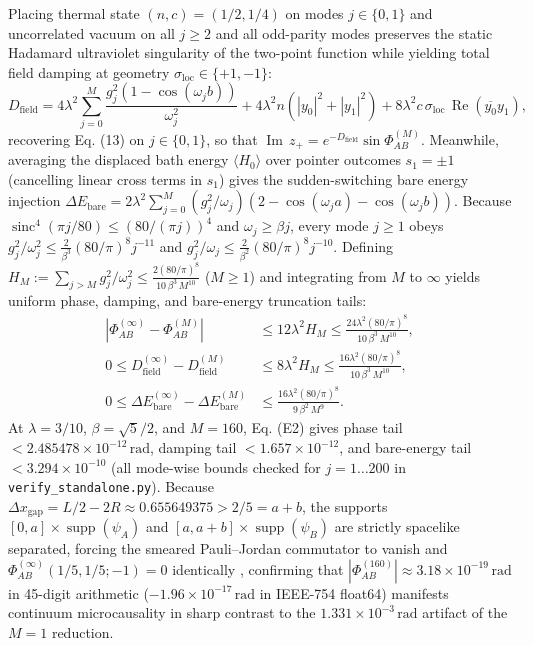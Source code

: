 \documentclass[11pt,letterpaper]{article}
\theoremstyle{definition}
\begin{document}
Placing thermal state \((n, c) = (1/2, 1/4)\) on modes
\(j \in \{0, 1\}\) and uncorrelated vacuum on all \(j \ge 2\) and all
odd-parity modes preserves the static Hadamard ultraviolet singularity
of the two-point function while yielding total field damping at geometry
\(\sigma_{\mathrm{loc}} \in \{+1, -1\}\):
\[D_{\mathrm{field}} = 4\lambda^2 \sum_{j=0}^{M} \frac{g_j^2(1 - \cos(\omega_j b))}{\omega_j^2} + 4\lambda^2 n\left(|y_0|^2 + |y_1|^2\right) + 8\lambda^2 c\,\sigma_{\mathrm{loc}}\,\operatorname{Re}\!\left(\overline{y_0}y_1\right),\]
recovering Eq. (13) on \(j \in \{0, 1\}\), so that
\(\operatorname{Im}\,z_+ = e^{-D_{\mathrm{field}}}\sin\Phi_{AB}^{(M)}\).
Meanwhile, averaging the displaced bath energy \(\langle H_0 \rangle\)
over pointer outcomes \(s_1 = \pm 1\) (cancelling linear cross terms in
\(s_1\)) gives the sudden-switching bare energy injection
\(\Delta E_{\mathrm{bare}} = 2\lambda^2 \sum_{j=0}^{M} (g_j^2/\omega_j)(2 - \cos(\omega_j a) - \cos(\omega_j b))\).
Because \(\operatorname{sinc}^4(\pi j/80) \le (80/(\pi j))^4\) and
\(\omega_j \ge \beta j\), every mode \(j \ge 1\) obeys
\(g_j^2/\omega_j^2 \le \frac{2}{\beta^3}(80/\pi)^8 j^{-11}\) and
\(g_j^2/\omega_j \le \frac{2}{\beta^2}(80/\pi)^8 j^{-10}\). Defining
\(H_M := \sum_{j > M} g_j^2/\omega_j^2 \le \frac{2(80/\pi)^8}{10\,\beta^3\,M^{10}}\)
(\(M \ge 1\)) and integrating from \(M\) to \(\infty\) yields uniform
phase, damping, and bare-energy truncation tails: \[\begin{aligned}
\left|\Phi_{AB}^{(\infty)} - \Phi_{AB}^{(M)}\right| &\le 12\lambda^2 H_M \le \frac{24\lambda^2(80/\pi)^8}{10\,\beta^3\,M^{10}}, \\
0 \le D_{\mathrm{field}}^{(\infty)} - D_{\mathrm{field}}^{(M)} &\le 8\lambda^2 H_M \le \frac{16\lambda^2(80/\pi)^8}{10\,\beta^3\,M^{10}}, \\
0 \le \Delta E_{\mathrm{bare}}^{(\infty)} - \Delta E_{\mathrm{bare}}^{(M)} &\le \frac{16\lambda^2(80/\pi)^8}{9\,\beta^2\,M^9}.
\end{aligned}
\tag{E2}\] At \(\lambda = 3/10\), \(\beta = \sqrt{5}/2\), and
\(M = 160\), Eq. (E2) gives phase tail
\(< 2.485478 \times 10^{-12}\,\mathrm{rad}\), damping tail
\(< 1.657 \times 10^{-12}\), and bare-energy tail
\(< 3.294 \times 10^{-10}\) (all mode-wise bounds checked for
\(j = 1 \dots 200\) in \texttt{verify\_standalone.py}). Because
\(\Delta x_{\mathrm{gap}} = L/2 - 2R \approx 0.655649375 > 2/5 = a + b\),
the supports \([0, a] \times \operatorname{supp}(\psi_A)\) and
\([a, a+b] \times \operatorname{supp}(\psi_B)\) are strictly spacelike
separated, forcing the smeared Pauli--Jordan commutator to vanish and
\(\Phi_{AB}^{(\infty)}(1/5, 1/5; -1) = 0\) identically
\citep{reedSimon1975, haag1996, wald1994, martinMartinez2015},
confirming that
\(|\Phi_{AB}^{(160)}| \approx 3.18 \times 10^{-19}\,\mathrm{rad}\) in
45-digit arithmetic (\(-1.96 \times 10^{-17}\,\mathrm{rad}\) in IEEE-754
float64) manifests continuum microcausality in sharp contrast to the
\(1.331 \times 10^{-3}\,\mathrm{rad}\) artifact of the \(M = 1\)
reduction.

\vspace{12pt}
\begingroup
{}
\small
\setlength{\bibsep}{3.0pt}


\endgroup
\end{document}
